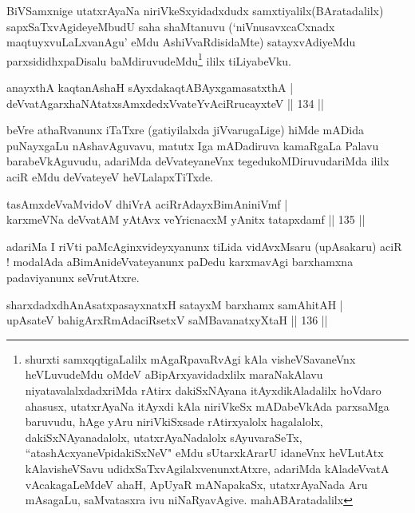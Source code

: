 \begin{artha}
BiVSamxnige utatxrAyaNa niriVkeSxyidadxdudx samxtiyalilx(BAratadalilx) sapxSaTxvAgide\break yeMbudU saha shaMtanuvu (`niVnusavxcaCxnadx maqtuyxvuLaLxvanAgu' eMdu AshiVvaRdisi\-daMte) satayxvAdiyeMdu parxsididhxpaDisalu baMdiruvudeMdu\footnote{shurxti  samxqqtigaLalilx mAgaRpavaRvAgi kAla visheVSavaneVnx heVLuvudeMdu oMdeV  aBipArxya\-vidadxlilx maraNakAlavu niyatavalalxdadxriMda rAtirx dakiSxNAyana itAyxdikAladalilx hoVdaro \-ahasusx, utatxrAyaNa itAyxdi  kAla niriVkeSx mADabeVkAda parxsaMga baruvudu, hAge yAru  niriVkiSxsade  rAtirxyalolx hagalalolx, dakiSxNAyanadalolx,  utatxrAyaNadalolx sAyuvaraSeTx, ``atashAcxyaneV\s pi\-dakiSxNeV" eMdu  sUtarxkArarU idaneVnx heVLutAtx kAlavisheVSavu  udidxSaTxvAgilalxvenunxtAtxre, adariMda kAladeVvatA vAcakagaLeMdeV  ahaH, ApUyaR mANapakaSx, utatxrAyaNada Aru mAsagaLu, saMvatasxra ivu  niNaRyavAgive. mahABAratadalilx} ililx tiLiyabeVku.
\end{artha}

\begin{shl}
anayxthA kaqtanAshaH sAyxdakaqtABAyxgamasatxthA | \\
deVvatAgarxhaNAtatxsAmxdedxVvateYvAciRrucayxteV \hfill|| 134 || 
\end{shl}

\begin{artha}
beVre athaRvanunx iTaTxre (gatiyilalxda jiVvarugaLige) hiMde mADida
puNayxgaLu nAshavAguvavu, matutx Iga mADadiruva kamaRgaLa Palavu
barabeVkAguvudu, adariMda deVvateyaneVnx tegedukoMDiruvudariMda ililx
aciR eMdu deVvateyeV heVLalapxTiTxde.
\end{artha}


\begin{shl}
tasAmxdeVvaMvidoV dhiVrA aciRrAdayxBimAniniVmf | \\
karxmeVNa deVvatAM yAtAvx veYricnacxM yAnitx tatapxdamf \hfill|| 135 || 
\end{shl}

\begin{artha}
adariMa I riVti paMcAginxvideyxyanunx tiLida vidAvxMsaru (upAsakaru)
aciR ! modalAda aBimAnideVvateyanunx paDedu karxmavAgi barxhamxna
padaviyanunx seVrutAtxre.
\end{artha}


\begin{shl}
sharxdadxdhAnAsatxpasayxnatxH satayxM barxhamx samAhitAH | \\
upAsateV bahigArxRmAdaciRsetxV saMBavanatxyXtaH \hfill|| 136 || 
\end{shl}

